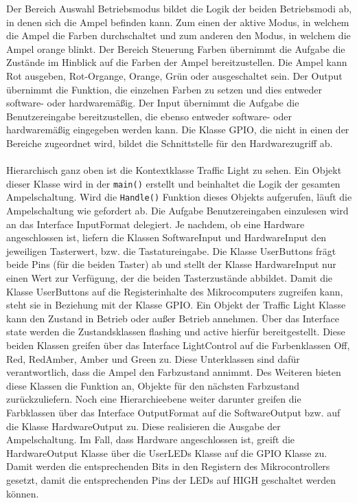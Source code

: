 Der Bereich \glqq Auswahl Betriebsmodus\grqq{} bildet die Logik der beiden Betriebsmodi ab, in denen sich die Ampel befinden kann. Zum einen der aktive Modus, in welchem die Ampel die Farben durchschaltet und zum anderen den Modus, in welchem die Ampel orange blinkt. Der Bereich \glqq Steuerung Farben \grqq{} übernimmt die Aufgabe die Zustände im Hinblick auf die Farben der Ampel bereitzustellen. Die Ampel kann Rot ausgeben, Rot-Organge, Orange, Grün oder ausgeschaltet sein. Der Output übernimmt die Funktion, die einzelnen Farben zu setzen und dies entweder software- oder hardwaremäßig. Der Input übernimmt die Aufgabe die Benutzereingabe bereitzustellen, die ebenso entweder software- oder hardwaremäßig eingegeben werden kann. Die Klasse GPIO, die nicht in einen der Bereiche zugeordnet wird, bildet die Schnittstelle für den Hardwarezugriff ab.\\
\\
Hierarchisch ganz oben ist die Kontextklasse \glqq Traffic Light\grqq{} zu sehen. Ein Objekt dieser Klasse wird in der\: \texttt{main()} erstellt und beinhaltet die Logik der gesamten Ampelschaltung. Wird die\: \texttt{Handle()} Funktion dieses Objekts aufgerufen, läuft die Ampelschaltung wie gefordert ab. Die Aufgabe Benutzereingaben einzulesen wird an das Interface \glqq InputFormat\grqq{} delegiert. Je nachdem, ob eine Hardware angeschlossen ist, liefern die Klassen \glqq SoftwareInput\grqq{} und \glqq HardwareInput\grqq{} den jeweiligen Tasterwert, bzw. die Tastatureingabe. Die Klasse \glqq UserButtons\grqq{} frägt beide Pins (für die beiden Taster) ab und stellt der Klasse \glqq HardwareInput\grqq{} nur einen Wert zur Verfügung, der die beiden Tasterzustände abbildet. Damit die Klasse \glqq UserButtons\grqq{} auf die Registerinhalte des Mikrocomputers zugreifen kann, steht sie in Beziehung mit der Klasse \glqq GPIO\grqq{}. Ein Objekt der \glqq Traffic Light\grqq{} Klasse kann den Zustand in Betrieb oder außer Betrieb annehmen. Über das Interface \glqq state\grqq{} werden die Zustandsklassen \glqq flashing\grqq{} und \glqq active\grqq{} hierfür bereitgestellt. Diese beiden Klassen greifen über das Interface \glqq LightControl\grqq{} auf die Farbenklassen \glqq Off\grqq{}, \glqq Red\grqq{}, \glqq RedAmber\grqq{}, \glqq Amber\grqq{} und \glqq Green\grqq{} zu. Diese Unterklassen sind dafür verantwortlich, dass die Ampel den Farbzustand annimmt. Des Weiteren bieten diese Klassen die Funktion an, Objekte für den nächsten Farbzustand zurückzuliefern. Noch eine Hierarchieebene weiter darunter greifen die Farbklassen über das Interface \glqq OutputFormat\grqq{} auf die \glqq SoftwareOutput\grqq{} bzw. auf die Klasse \glqq HardwareOutput\grqq{} zu. Diese realisieren die Ausgabe der Ampelschaltung. Im Fall, dass Hardware angeschlossen ist, greift die \glqq HardwareOutput\grqq{} Klasse über die \glqq UserLEDs\grqq{} Klasse auf die \glqq GPIO\grqq{} Klasse zu. Damit werden die entsprechenden Bits in den Registern des Mikrocontrollers gesetzt, damit die entsprechenden Pins der LEDs auf HIGH geschaltet werden können.

